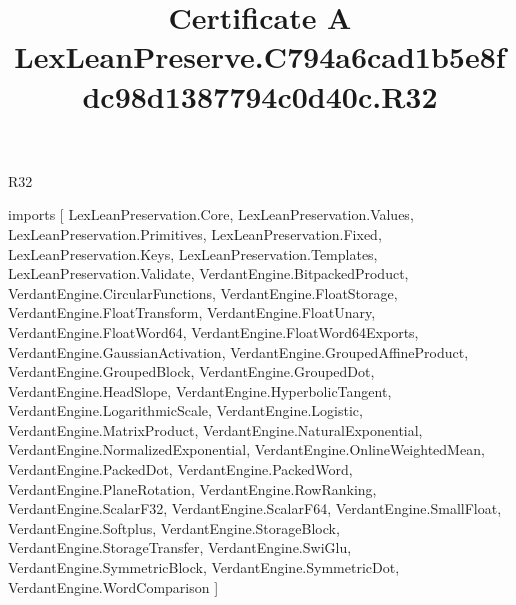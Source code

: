 \begin{lexlean}{R32}
\title{Certificate A LexLeanPreserve.C794a6cad1b5e8fdc98d1387794c0d40c.R32}
\begin{coremodule}
imports [
  LexLeanPreservation.Core,
  LexLeanPreservation.Values,
  LexLeanPreservation.Primitives,
  LexLeanPreservation.Fixed,
  LexLeanPreservation.Keys,
  LexLeanPreservation.Templates,
  LexLeanPreservation.Validate,
  VerdantEngine.BitpackedProduct,
  VerdantEngine.CircularFunctions,
  VerdantEngine.FloatStorage,
  VerdantEngine.FloatTransform,
  VerdantEngine.FloatUnary,
  VerdantEngine.FloatWord64,
  VerdantEngine.FloatWord64Exports,
  VerdantEngine.GaussianActivation,
  VerdantEngine.GroupedAffineProduct,
  VerdantEngine.GroupedBlock,
  VerdantEngine.GroupedDot,
  VerdantEngine.HeadSlope,
  VerdantEngine.HyperbolicTangent,
  VerdantEngine.LogarithmicScale,
  VerdantEngine.Logistic,
  VerdantEngine.MatrixProduct,
  VerdantEngine.NaturalExponential,
  VerdantEngine.NormalizedExponential,
  VerdantEngine.OnlineWeightedMean,
  VerdantEngine.PackedDot,
  VerdantEngine.PackedWord,
  VerdantEngine.PlaneRotation,
  VerdantEngine.RowRanking,
  VerdantEngine.ScalarF32,
  VerdantEngine.ScalarF64,
  VerdantEngine.SmallFloat,
  VerdantEngine.Softplus,
  VerdantEngine.StorageBlock,
  VerdantEngine.StorageTransfer,
  VerdantEngine.SwiGlu,
  VerdantEngine.SymmetricBlock,
  VerdantEngine.SymmetricDot,
  VerdantEngine.WordComparison
]


\end{coremodule}
\end{lexlean}
